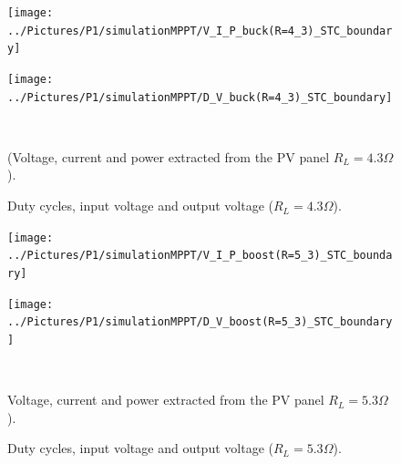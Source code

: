 \begin{figure}[H]
	\begin{minipage}[c]{0.6\textwidth}
		\centering
		\texttt{[image: ../Pictures/P1/simulationMPPT/V\_I\_P\_buck(R=4\_3)\_STC\_boundary]} %
	\end{minipage}%
	\hfill
	\begin{minipage}[c]{0.6\textwidth}
		\centering
		\texttt{[image: ../Pictures/P1/simulationMPPT/D\_V\_buck(R=4\_3)\_STC\_boundary]} %
	\end{minipage} \\ %
	\begin{minipage}[t]{0.6\textwidth}
		\caption{ (Voltage, current and power extracted from the PV panel $R_{L}=4.3\Omega$).} %
		\label{buckboundary1}
	\end{minipage}%
	\hfill
	\begin{minipage}[t]{0.6\textwidth}
		\caption{Duty cycles, input voltage and output voltage ($R_{L}=4.3\Omega$).} %
		\label{buckboundary2}
	\end{minipage}
\end{figure}


\vspace{1cm}
\begin{figure}[H]
	\begin{minipage}[c]{0.6\textwidth}
		\centering
		\texttt{[image: ../Pictures/P1/simulationMPPT/V\_I\_P\_boost(R=5\_3)\_STC\_boundary]} %
	\end{minipage}%
	\hfill
	\begin{minipage}[c]{0.6\textwidth}
		\centering
		\texttt{[image: ../Pictures/P1/simulationMPPT/D\_V\_boost(R=5\_3)\_STC\_boundary]} %
	\end{minipage} \\ %
	\begin{minipage}[t]{0.6\textwidth}
		\caption{Voltage, current and power extracted from the PV panel $R_{L}=5.3\Omega$).} %
		\label{boostboundary1}
	\end{minipage}%
	\hfill
	\begin{minipage}[t]{0.6\textwidth}
		\caption{Duty cycles, input voltage and output voltage ($R_{L}=5.3\Omega$).} %
		\label{boostboundary2}
	\end{minipage}
\end{figure}


